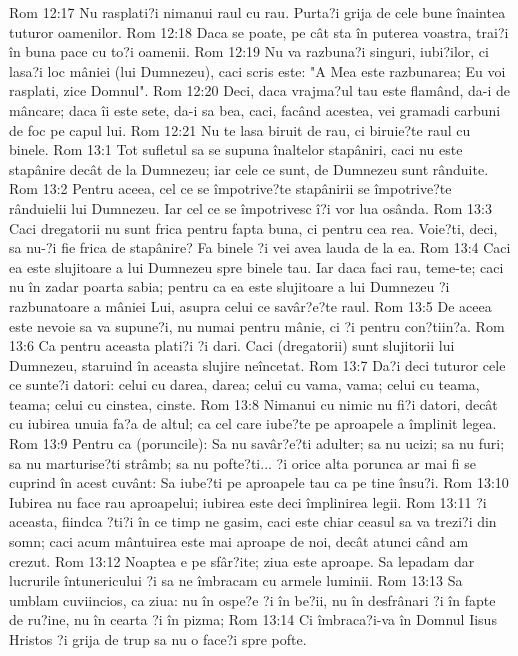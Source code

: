 Rom 12:17  Nu rasplati?i nimanui raul cu rau. Purta?i grija de cele bune înaintea tuturor oamenilor.
Rom 12:18  Daca se poate, pe cât sta în puterea voastra, trai?i în buna pace cu to?i oamenii.
Rom 12:19  Nu va razbuna?i singuri, iubi?ilor, ci lasa?i loc mâniei (lui Dumnezeu), caci scris este: "A Mea este razbunarea; Eu voi rasplati, zice Domnul".
Rom 12:20  Deci, daca vrajma?ul tau este flamând, da-i de mâncare; daca îi este sete, da-i sa bea, caci, facând acestea, vei gramadi carbuni de foc pe capul lui.
Rom 12:21  Nu te lasa biruit de rau, ci biruie?te raul cu binele.
Rom 13:1  Tot sufletul sa se supuna înaltelor stapâniri, caci nu este stapânire decât de la Dumnezeu; iar cele ce sunt, de Dumnezeu sunt rânduite.
Rom 13:2  Pentru aceea, cel ce se împotrive?te stapânirii se împotrive?te rânduielii lui Dumnezeu. Iar cel ce se împotrivesc î?i vor lua osânda.
Rom 13:3  Caci dregatorii nu sunt frica pentru fapta buna, ci pentru cea rea. Voie?ti, deci, sa nu-?i fie frica de stapânire? Fa binele ?i vei avea lauda de la ea.
Rom 13:4  Caci ea este slujitoare a lui Dumnezeu spre binele tau. Iar daca faci rau, teme-te; caci nu în zadar poarta sabia; pentru ca ea este slujitoare a lui Dumnezeu ?i razbunatoare a mâniei Lui, asupra celui ce savâr?e?te raul.
Rom 13:5  De aceea este nevoie sa va supune?i, nu numai pentru mânie, ci ?i pentru con?tiin?a.
Rom 13:6  Ca pentru aceasta plati?i ?i dari. Caci (dregatorii) sunt slujitorii lui Dumnezeu, staruind în aceasta slujire neîncetat.
Rom 13:7  Da?i deci tuturor cele ce sunte?i datori: celui cu darea, darea; celui cu vama, vama; celui cu teama, teama; celui cu cinstea, cinste.
Rom 13:8  Nimanui cu nimic nu fi?i datori, decât cu iubirea unuia fa?a de altul; ca cel care iube?te pe aproapele a împlinit legea.
Rom 13:9  Pentru ca (poruncile): Sa nu savâr?e?ti adulter; sa nu ucizi; sa nu furi; sa nu marturise?ti strâmb; sa nu pofte?ti... ?i orice alta porunca ar mai fi se cuprind în acest cuvânt: Sa iube?ti pe aproapele tau ca pe tine însu?i.
Rom 13:10  Iubirea nu face rau aproapelui; iubirea este deci împlinirea legii.
Rom 13:11  ?i aceasta, fiindca ?ti?i în ce timp ne gasim, caci este chiar ceasul sa va trezi?i din somn; caci acum mântuirea este mai aproape de noi, decât atunci când am crezut.
Rom 13:12  Noaptea e pe sfâr?ite; ziua este aproape. Sa lepadam dar lucrurile întunericului ?i sa ne îmbracam cu armele luminii.
Rom 13:13  Sa umblam cuviincios, ca ziua: nu în ospe?e ?i în be?ii, nu în desfrânari ?i în fapte de ru?ine, nu în cearta ?i în pizma;
Rom 13:14  Ci îmbraca?i-va în Domnul Iisus Hristos ?i grija de trup sa nu o face?i spre pofte.
